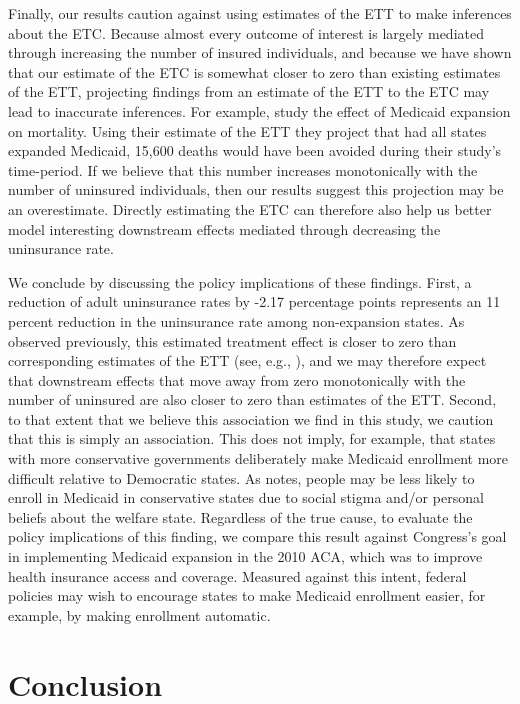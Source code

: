 \documentclass[aoas]{imsart}
\theoremstyle{plain}
\theoremstyle{remark}
\begin{document}
Finally, our results caution against using estimates of the ETT to make inferences about the ETC. Because almost every outcome of interest is largely mediated through increasing the number of insured individuals, and because we have shown that our estimate of the ETC is somewhat closer to zero than existing estimates of the ETT, projecting findings from an estimate of the ETT to the ETC may lead to inaccurate inferences. For example, \cite{miller2019medicaid} study the effect of Medicaid expansion on mortality. Using their estimate of the ETT they project that had all states expanded Medicaid, 15,600 deaths would have been avoided during their study's time-period. If we believe that this number increases monotonically with the number of uninsured individuals, then our results suggest this projection may be an overestimate. Directly estimating the ETC can therefore also help us better model interesting downstream effects mediated through decreasing the uninsurance rate. 

We conclude by discussing the policy implications of these findings. First, a reduction of adult uninsurance rates by -2.17 percentage points represents an 11 percent reduction in the uninsurance rate among non-expansion states. As observed previously, this estimated treatment effect is closer to zero than corresponding estimates of the ETT (see, e.g., \cite{courtemanche2017early}), and we may therefore expect that downstream effects that move away from zero monotonically with the number of uninsured are also closer to zero than estimates of the ETT. Second, to that extent that we believe this association we find in this study, we caution that this is simply an association. This does not imply, for example, that states with more conservative governments deliberately make Medicaid enrollment more difficult relative to Democratic states. As \cite{sommers2012understanding} notes, people may be less likely to enroll in Medicaid in conservative states due to social stigma and/or personal beliefs about the welfare state. Regardless of the true cause, to evaluate the policy implications of this finding, we compare this result against Congress's goal in implementing Medicaid expansion in the 2010 ACA, which was to improve health insurance access and coverage. Measured against this intent, federal policies may wish to encourage states to make Medicaid enrollment easier, for example, by making enrollment automatic. 

\section{Conclusion}
\end{document}
